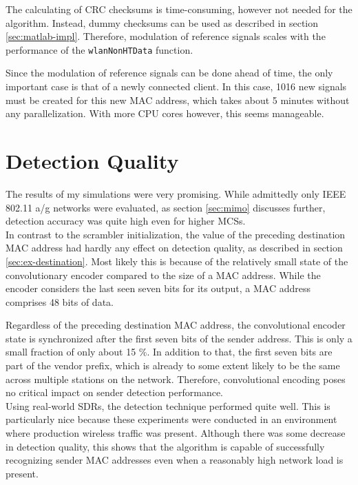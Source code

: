 The calculating of CRC checksums is time-consuming, however not needed for the algorithm. Instead, dummy checksums can be used as described in section \ref{sec:matlab-impl}. Therefore, modulation of reference signals scales with the performance of the \texttt{wlanNonHTData} function.

Since the modulation of reference signals can be done ahead of time, the only important case is that of a newly connected client. In this case, 1016 new signals must be created for this new MAC address, which takes about 5 minutes without any parallelization. With more CPU cores however, this seems manageable.



\section{Detection Quality}\label{sec:detection-quality}

The results of my simulations were very promising. While admittedly only IEEE 802.11 a/g networks were evaluated, as section \ref{sec:mimo} discusses further, detection accuracy was quite high even for higher \glspl{MCS}.\\

In contrast to the scrambler initialization, the value of the preceding destination MAC address had hardly any effect on detection quality, as described in section \ref{sec:ex-destination}. Most likely this is because of the relatively small state of the convolutionary encoder compared to the size of a MAC address. While the encoder considers the last seen seven bits for its output, a MAC address comprises 48 bits of data.

Regardless of the preceding destination MAC address, the convolutional encoder state is synchronized after the first seven bits of the sender address. This is only a small fraction of only about 15 \%. In addition to that, the first seven bits are part of the vendor prefix, which is already to some extent likely to be the same across multiple stations on the network. Therefore, convolutional encoding poses no critical impact on sender detection performance.\\

Using real-world \glspl{SDR}, the detection technique performed quite well. This is particularly nice because these experiments were conducted in an environment where production wireless traffic was present. Although there was some decrease in detection quality, this shows that the algorithm is capable of successfully recognizing sender MAC addresses even when a reasonably high network load is present.


